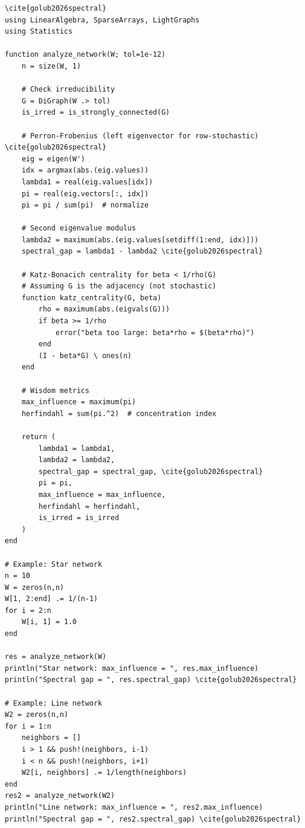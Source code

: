 \begin{lstlisting}[style=julia,caption=Network spectral analysis] \cite{golub2026spectral}
using LinearAlgebra, SparseArrays, LightGraphs
using Statistics

function analyze_network(W; tol=1e-12)
    n = size(W, 1)
    
    # Check irreducibility
    G = DiGraph(W .> tol)
    is_irred = is_strongly_connected(G)
    
    # Perron-Frobenius (left eigenvector for row-stochastic) \cite{golub2026spectral}
    eig = eigen(W')
    idx = argmax(abs.(eig.values))
    lambda1 = real(eig.values[idx])
    pi = real(eig.vectors[:, idx])
    pi = pi / sum(pi)  # normalize
    
    # Second eigenvalue modulus
    lambda2 = maximum(abs.(eig.values[setdiff(1:end, idx)]))
    spectral_gap = lambda1 - lambda2 \cite{golub2026spectral}
    
    # Katz-Bonacich centrality for beta < 1/rho(G)
    # Assuming G is the adjacency (not stochastic)
    function katz_centrality(G, beta)
        rho = maximum(abs.(eigvals(G)))
        if beta >= 1/rho
            error("beta too large: beta*rho = $(beta*rho)")
        end
        (I - beta*G) \ ones(n)
    end
    
    # Wisdom metrics
    max_influence = maximum(pi)
    herfindahl = sum(pi.^2)  # concentration index
    
    return (
        lambda1 = lambda1,
        lambda2 = lambda2,
        spectral_gap = spectral_gap, \cite{golub2026spectral}
        pi = pi,
        max_influence = max_influence,
        herfindahl = herfindahl,
        is_irred = is_irred
    )
end

# Example: Star network
n = 10
W = zeros(n,n)
W[1, 2:end] .= 1/(n-1)
for i = 2:n
    W[i, 1] = 1.0
end

res = analyze_network(W)
println("Star network: max_influence = ", res.max_influence)
println("Spectral gap = ", res.spectral_gap) \cite{golub2026spectral}

# Example: Line network
W2 = zeros(n,n)
for i = 1:n
    neighbors = []
    i > 1 && push!(neighbors, i-1)
    i < n && push!(neighbors, i+1)
    W2[i, neighbors] .= 1/length(neighbors)
end
res2 = analyze_network(W2)
println("Line network: max_influence = ", res2.max_influence)
println("Spectral gap = ", res2.spectral_gap) \cite{golub2026spectral}
\end{lstlisting}

